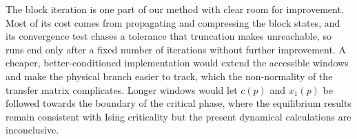 \documentclass[a4paper,onecolumn,11pt,unpublished]{quantumarticle}
\begin{document}
The block iteration is one part of our method with clear room for improvement. Most of its cost comes from propagating and compressing the block states, and its convergence test chases a tolerance that truncation makes unreachable, so runs end only after a fixed number of iterations without further improvement. A cheaper, better-conditioned implementation would extend the accessible windows and make the physical branch easier to track, which the non-normality of the transfer matrix complicates. Longer windows would let $c(p)$ and $x_1(p)$ be followed towards the boundary of the critical phase, where the equilibrium results remain consistent with Ising criticality but the present dynamical calculations are inconclusive.

\clearpage



\clearpage


\end{document}

